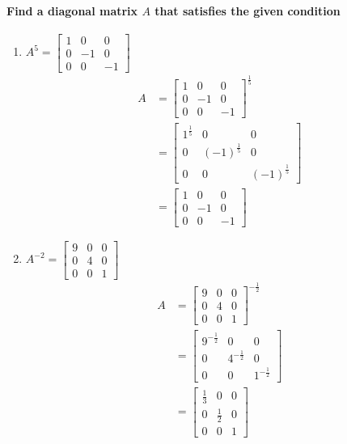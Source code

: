 \documentclass[
  letterpaper,
  DIV=11,
  numbers=noendperiod]{scrartcl}
\let\oldparagraph\paragraph
\renewcommand{\paragraph}[1]{\oldparagraph{#1}\mbox{}}
\providecommand{\tightlist}{%
  \setlength{\itemsep}{0pt}\setlength{\parskip}{0pt}}\usepackage{longtable,booktabs,array}
\begin{document}
\newpage{}

\paragraph{\texorpdfstring{Find a diagonal matrix \(A\) that satisfies
the given
condition}{Find a diagonal matrix A that satisfies the given condition}}\label{find-a-diagonal-matrix-a-that-satisfies-the-given-condition}

\begin{enumerate}
\def\labelenumi{\arabic{enumi})}
\tightlist
\item
  \(A^5=\begin{bmatrix}1 & 0 & 0 \\ 0 & -1 & 0 \\ 0 & 0 & -1\end{bmatrix}\)
  \begin{align*}
  A &= \begin{bmatrix}1 & 0 & 0 \\ 0 & -1 & 0 \\ 0 & 0 & -1\end{bmatrix}^{\frac{1}{5}} \\
  &= \begin{bmatrix}1^{\frac{1}{5}} & 0 & 0 \\ 0 & (-1)^{\frac{1}{5}} & 0 \\ 0 & 0 & (-1)^{\frac{1}{5}}\end{bmatrix} \\
  &= \begin{bmatrix}1 & 0 & 0 \\ 0 & -1 & 0 \\ 0 & 0 & -1\end{bmatrix}
  \end{align*}
\item
  \(A^{-2}=\begin{bmatrix}9 & 0 & 0 \\ 0 & 4 & 0 \\ 0 & 0 & 1\end{bmatrix}\)
  \begin{align*}
  A &= \begin{bmatrix}9 & 0 & 0 \\ 0 & 4 & 0 \\ 0 & 0 & 1\end{bmatrix}^{-\frac{1}{2}} \\
  &= \begin{bmatrix}9^{-\frac{1}{2}} & 0 & 0 \\ 0 & 4^{-\frac{1}{2}} & 0 \\ 0 & 0 & 1^{-\frac{1}{2}}\end{bmatrix} \\
  &= \begin{bmatrix}\frac{1}{3} & 0 & 0 \\ 0 & \frac{1}{2} & 0 \\ 0 & 0 & 1\end{bmatrix}
  \end{align*}
\end{enumerate}
\end{document}
